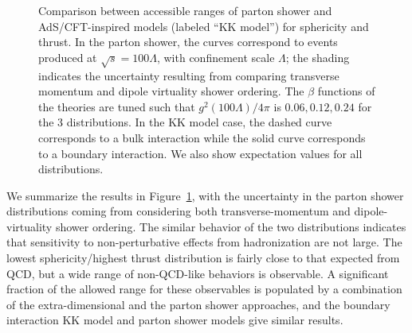 \begin{figure}[tb!]
	\caption{Comparison between accessible ranges of parton shower and AdS/CFT-inspired models (labeled ``KK model'') for sphericity and thrust. In the parton shower, the curves correspond to events produced at $\sqrt{s} = 100\Lambda$, with confinement scale $\Lambda$; the shading indicates the uncertainty resulting from comparing transverse momentum and dipole virtuality shower ordering. The $\beta$ functions of the theories are tuned such that $g^2(100\Lambda)/4\pi$ is $0.06, 0.12, 0.24$ for the 3 distributions. In the KK model case, the dashed curve corresponds to a bulk interaction while the solid curve corresponds to a boundary interaction. We also show expectation values for all distributions.}
	\label{fig:compplots}
\end{figure}

We summarize the results in Figure~\ref{fig:compplots}, with the uncertainty in the parton shower distributions coming from considering both transverse-momentum and dipole-virtuality shower ordering. The similar behavior of the two distributions indicates that sensitivity to non-perturbative effects from hadronization are not large.  The lowest sphericity/highest thrust distribution is fairly close to that expected from QCD, but a wide range of non-QCD-like behaviors is observable. A significant fraction of the allowed range for these observables is populated by a combination of the extra-dimensional and the parton shower approaches, and the boundary interaction KK model and parton shower models give similar results.

